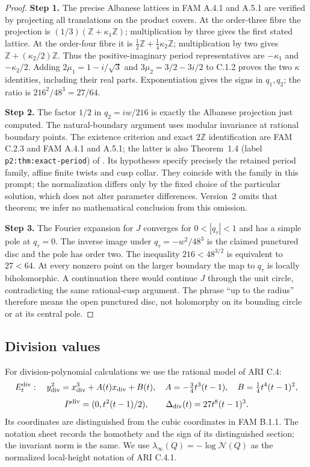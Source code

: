 \documentclass[11pt,a4paper]{article}
\theoremstyle{plain}
\theoremstyle{definition}
\begin{document}
\begin{proof}
\noindent\textbf{Step 1.} The precise Albanese lattices in FAM A.4.1 and A.5.1 are verified by projecting all
translations on the product covers. At the order-three fibre the
projection is $(1/3)(\mathbb Z+\kappa_1\mathbb Z)$; multiplication by
three gives the first stated lattice. At the order-four fibre it is
$\tfrac12\mathbb Z+\tfrac14\kappa_2\mathbb Z$; multiplication by two
gives $\mathbb Z+(\kappa_2/2)\mathbb Z$. Thus the positive-imaginary
period representatives are $-\kappa_1$ and $-\kappa_2/2$.
Adding $2\mu_1=1-i/\sqrt3$ and
$3\mu_2=3/2-3i/2$ to C.1.2 proves the two $\kappa$ identities,
including their real parts. Exponentiation gives the signs in $q_1,q_2$;
the ratio is $216^2/48^3=27/64$.


\noindent\textbf{Step 2.} The factor $1/2$ in $q_2=iw/216$ is exactly the Albanese projection just computed. The natural-boundary argument uses modular invariance at rational boundary points. The existence criterion and exact $2\mathbb Z$
identification are FAM C.2.3 and FAM A.4.1 and A.5.1; the latter is also Theorem~1.4
(label \texttt{p2:thm:exact-period}) of
\cite[Theorem~1.4 (\texttt{p2:thm:exact-period})]{DGKXv1}. Its hypotheses specify precisely the
retained period family, affine finite twists and cusp collar. They
coincide with the family in this prompt; the normalization differs
only by the fixed choice of the particular solution, which does not
alter parameter differences. Version~2 \cite[Introduction]{DGKXv2} omits that theorem; we infer
no mathematical conclusion from this omission.


\noindent\textbf{Step 3.} The Fourier expansion for $J$ converges for $0<|q_\tau|<1$ and has a simple
pole at $q_\tau=0$. The inverse image under $q_\tau=-w^2/48^3$ is the claimed
punctured disc and the pole has order two. The inequality
$216<48^{3/2}$ is equivalent to $27<64$. At every nonzero point on the
larger boundary the map to $q_\tau$ is locally biholomorphic. A continuation
there would continue $J$ through the unit circle, contradicting the
same rational-cusp argument. The phrase ``up to the
radius'' therefore means the open punctured disc, not holomorphy on
its bounding circle or at its central pole.
\end{proof}

\subsection{Division values}
For division-polynomial calculations we use the rational model of ARI C.4:
\[
E^{\rm div}_t:\quad y_{\rm div}^2=x_{\rm div}^3+A(t)x_{\rm div}+B(t),\quad
A=-\tfrac34t^3(t-1),\quad B=\tfrac14t^4(t-1)^2,
\]
\[
P^{\rm div}=(0,t^2(t-1)/2),\qquad \Delta_{\rm div}(t)=27t^8(t-1)^3.
\]
Its coordinates are distinguished from the cubic coordinates in FAM B.1.1. The notation sheet records the homothety and the sign of its distinguished section; the invariant norm is the same. We use $\lambda_\infty(Q)=-\log\mathcal N(Q)$ as the normalized local-height notation of ARI C.4.1.
\end{document}
